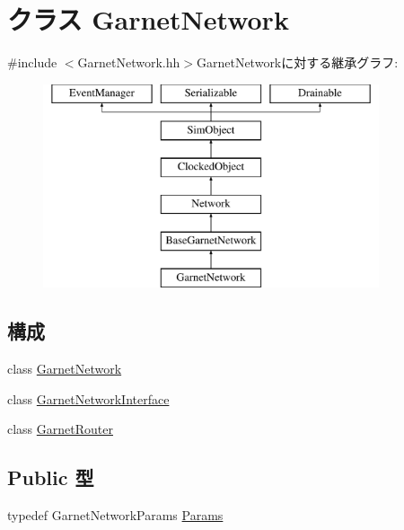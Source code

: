 \hypertarget{classGarnetNetwork}{
\section{クラス GarnetNetwork}
\label{classGarnetNetwork}
}


{\ttfamily \#include $<$GarnetNetwork.hh$>$}GarnetNetworkに対する継承グラフ:\begin{figure}[H]
\begin{center}
\leavevmode
\includegraphics[height=6cm]{classGarnetNetwork}
\end{center}
\end{figure}
\subsection*{構成}
\begin{DoxyCompactItemize}
\item 
class \hyperlink{classGarnetNetwork_1_1GarnetNetwork}{GarnetNetwork}
\item 
class \hyperlink{classGarnetNetwork_1_1GarnetNetworkInterface}{GarnetNetworkInterface}
\item 
class \hyperlink{classGarnetNetwork_1_1GarnetRouter}{GarnetRouter}
\end{DoxyCompactItemize}
\subsection*{Public 型}
\begin{DoxyCompactItemize}
\item 
typedef GarnetNetworkParams \hyperlink{classGarnetNetwork_af1f02e00eac1bf3521780f99a28259a5}{Params}
\end{DoxyCompactItemize}
